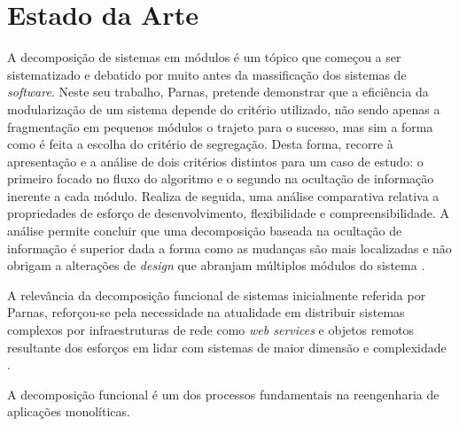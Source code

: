 


 

\chapter{Estado da Arte}
    
    A decomposição de sistemas em módulos é um tópico que começou a ser sistematizado e debatido por \cite{parnas72_decomposing_systems} muito antes da massificação dos sistemas de \textit{software}. Neste seu trabalho, Parnas, pretende demonstrar que a eficiência da modularização de um sistema depende do critério utilizado, não sendo apenas a fragmentação em pequenos módulos o trajeto para o sucesso, mas sim a forma como é feita a escolha do critério de segregação. 
    Desta forma, recorre à apresentação e a análise de dois critérios distintos para um caso de estudo: o primeiro focado no fluxo do algoritmo e o segundo na ocultação de informação inerente a cada módulo. Realiza de seguida, uma análise comparativa relativa a propriedades de esforço de desenvolvimento, flexibilidade e compreensibilidade. A análise permite concluir que uma decomposição baseada na ocultação de informação é superior dada a forma como as mudanças são mais localizadas e não obrigam a alterações de \textit{design} que abranjam múltiplos módulos do sistema \cite{parnas72_decomposing_systems}. 
   
    A relevância da decomposição funcional de sistemas inicialmente referida por Parnas, reforçou-se pela necessidade na atualidade em distribuir sistemas complexos por infraestruturas de rede como \textit{web services} e objetos remotos resultante dos esforços em lidar com sistemas de maior dimensão e complexidade \citep{kamimura18_city_analogy}. 
    
   
    A decomposição funcional é um dos processos fundamentais na reengenharia de aplicações monolíticas. 


